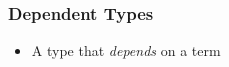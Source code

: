 \begin{frame}
\frametitle{Dependent Types}
\begin{itemize}
\item A type that \emph{depends} on a term
\begin{code}%
\>[0]\AgdaSpace{}%
\AgdaSpace{}%
\AgdaSymbol{(}\AgdaSpace{}%
\AgdaSymbol{:}\AgdaSpace{}%
\AgdaSymbol{)}\AgdaSpace{}%
\AgdaSymbol{:}\AgdaSpace{}%
\AgdaSpace{}%
\AgdaSpace{}%
\AgdaSpace{}%
\<%
\\
\>[0][@{}l@{\AgdaIndent{0}}]%
\>[2]\AgdaInductiveConstructor{[]}\AgdaSpace{}%
\AgdaSymbol{:}\AgdaSpace{}%
\AgdaSpace{}%
\AgdaSpace{}%
\<%
\\
%
\>[2]\AgdaSpace{}%
\AgdaSymbol{:}\AgdaSpace{}%
\AgdaSpace{}%
\AgdaSymbol{\{}\AgdaSymbol{\}}\AgdaSpace{}%
\AgdaSpace{}%
\AgdaSpace{}%
\AgdaSpace{}%
\AgdaSpace{}%
\AgdaSpace{}%
\AgdaSpace{}%
\AgdaSpace{}%
\AgdaSpace{}%
\AgdaSpace{}%
\AgdaSymbol{(}\AgdaSpace{}%
\AgdaSymbol{)}\<%
\end{code}


\end{itemize}
\end{frame}
